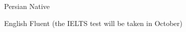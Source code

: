 

\begin{cvskills}

    \cvskill
    {Persian}
    {Native}

    \cvskill
    {English}
    {Fluent (the IELTS test will be taken in October)}
\end{cvskills}
